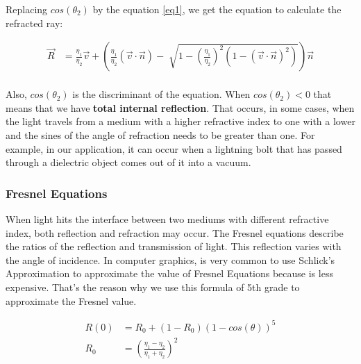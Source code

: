 \documentclass[titlepage,12pt]{report}
\begin{document}
Replacing $cos(\theta_2)$ by the equation \ref{eq1}, we get the equation to calculate the refracted ray:

\begin{equation} \label{refracted_ray_2}
\begin{split}
\vec{R} & = \frac{\eta_1}{\eta_2} \vec{v} + \left(\frac{\eta_1}{\eta_2} (\vec{v} \cdot \vec{n}) - \sqrt[]{1 - \left(\frac{\eta_1}{\eta_2} \right)^2 \left(1 - ( \vec{v} \cdot \vec{n})^2\right)} \right) \vec{n} \\
\end{split}
\end{equation}

Also, $cos(\theta_2)$ is the discriminant of the equation. When $cos(\theta_2) < 0$ that means that we have \textbf{total internal reflection}. That occurs, in some cases, when the light travels from a medium with a higher refractive index to one with a lower and the sines of the angle of refraction needs to be greater than one. For example, in our application, it can occur when a lightning bolt that has passed through a dielectric object comes out of it into a vacuum.

\subsubsection{Fresnel Equations}

When light hits the interface between two mediums with different refractive index, both reflection and refraction may occur. The Fresnel equations describe the ratios of the reflection and transmission of light. This reflection varies with the angle of incidence. In computer graphics, is very common to use Schlick's Approximation \citep{Schlick1994} to approximate the value of Fresnel Equations because is less expensive. That's the reason why we use this formula of 5th grade to approximate the Fresnel value.

\begin{equation} \label{schlick}
\begin{split}
R(0) & = R_0 + (1 - R_0) \left(1 - cos(\theta)\right)^5 \\
R_0 & = \left(\frac{\eta_1 - \eta_2}{\eta_1 + \eta_2}\right)^2
\end{split}
\end{equation}
\end{document}
